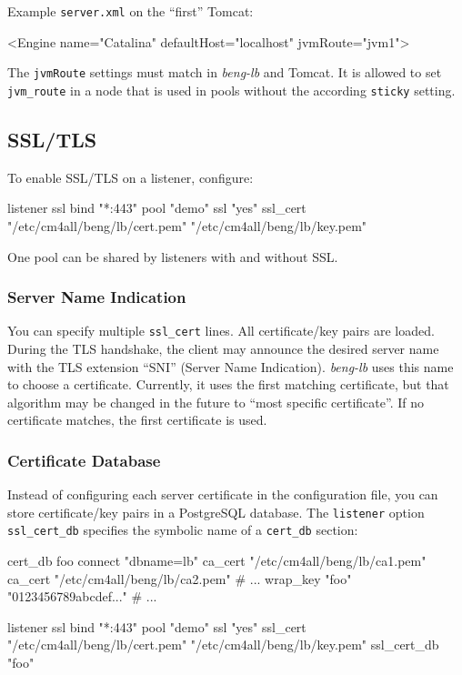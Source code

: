 \documentclass[a4paper,12pt]{article}
\begin{document}
Example \texttt{server.xml} on the ``first'' Tomcat:

\begin{verbatim*}
<Engine name="Catalina" defaultHost="localhost" jvmRoute="jvm1">
\end{verbatim*}

The \verb|jvmRoute| settings must match in \emph{beng-lb} and Tomcat.
It is allowed to set \verb|jvm_route| in a node that is used in pools
without the according \verb|sticky| setting.

\subsection{SSL/TLS}
\label{ssl}

To enable SSL/TLS on a listener, configure:

\begin{verbatim*}
listener ssl {
  bind "*:443"
  pool "demo"
  ssl "yes"
  ssl_cert "/etc/cm4all/beng/lb/cert.pem" "/etc/cm4all/beng/lb/key.pem"
}
\end{verbatim*}

One pool can be shared by listeners with and without SSL.

\subsubsection{Server Name Indication}

You can specify multiple \verb|ssl_cert| lines.  All certificate/key
pairs are loaded.  During the TLS handshake, the client may announce
the desired server name with the TLS extension ``SNI'' (Server Name
Indication).  \emph{beng-lb} uses this name to choose a certificate.
Currently, it uses the first matching certificate, but that algorithm
may be changed in the future to ``most specific certificate''.  If no
certificate matches, the first certificate is used.

\subsubsection{Certificate Database}
\label{certdbconfig}

Instead of configuring each server certificate in the configuration
file, you can store certificate/key pairs in a PostgreSQL database.
The \texttt{listener} option \verb|ssl_cert_db| specifies the symbolic
name of a \verb|cert_db| section:

\begin{verbatim*}
cert_db foo {
  connect "dbname=lb"
  ca_cert "/etc/cm4all/beng/lb/ca1.pem"
  ca_cert "/etc/cm4all/beng/lb/ca2.pem"
  # ...
  wrap_key "foo" "0123456789abcdef..."
  # ...
}

listener ssl {
  bind "*:443"
  pool "demo"
  ssl "yes"
  ssl_cert "/etc/cm4all/beng/lb/cert.pem" "/etc/cm4all/beng/lb/key.pem"
  ssl_cert_db "foo"
}
\end{verbatim*}
\end{document}
